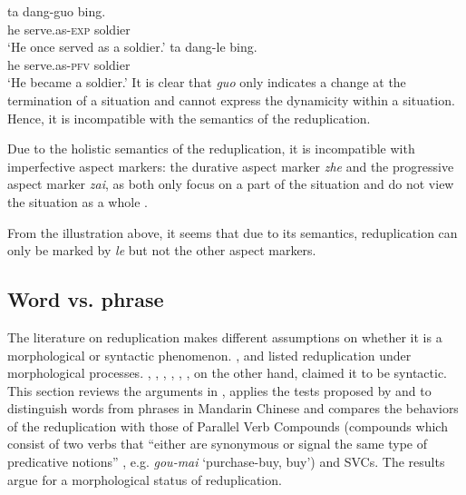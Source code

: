\ea
  \ea\label{ex:guo-dyn}
    \gll ta dang-guo bing.\\
    he serve.as-\textsc{exp} soldier\\ 
    \glt `He once served as a soldier.'
  \ex\label{ex:le-dyn}
    \gll ta dang-le bing.\\
    he serve.as-\textsc{pfv} soldier\\ 
    \glt `He became a soldier.'
  \z
\z
It is clear that \textit{guo} only indicates a change at the termination of a situation and cannot express the dynamicity within a situation.
Hence, it is incompatible with the semantics of the reduplication.

Due to the holistic semantics of the reduplication, it is incompatible with imperfective aspect markers: the durative aspect marker \textit{zhe} and the progressive aspect marker \textit{zai}, as both only focus on  a part of the situation and do not view the situation as a whole \citep[Ch. 5]{XiaoMcEnery2004}.

From the illustration above, it seems that due to its semantics, reduplication can only be marked by \textit{le} but not the other aspect markers.








\subsection{Word vs. phrase}\label{sec:word}

The literature on reduplication makes different assumptions on whether it is a morphological or syntactic phenomenon.
\citet{Chao1968}, \citet{LiThompson1981} and \citet{Liao2014} listed reduplication under morphological processes. 
\citet{Arcodiaetal2014}, \citet{Xiong2016}, \citet{BascianoMelloni2017}, \citet{YangWei2017}, \citet{MelloniBasciano2018}, \citet{Xie2020},   on the other hand, claimed it to be syntactic.
This section reviews the arguments in \citet{Xie2020}, applies the tests proposed by \citet{Duanmu1998} and \citet{Schaefer2009} to distinguish words from phrases in Mandarin Chinese 
and compares the behaviors of the reduplication with those of Parallel Verb Compounds 
(compounds which consist of two verbs that ``either are synonymous or signal the same type of predicative notions'' \citep[68]{LiThompson1981}, e.g. \textit{gou-mai} `purchase-buy, buy') and {SVC}s. 
The results argue for a morphological status of reduplication.



